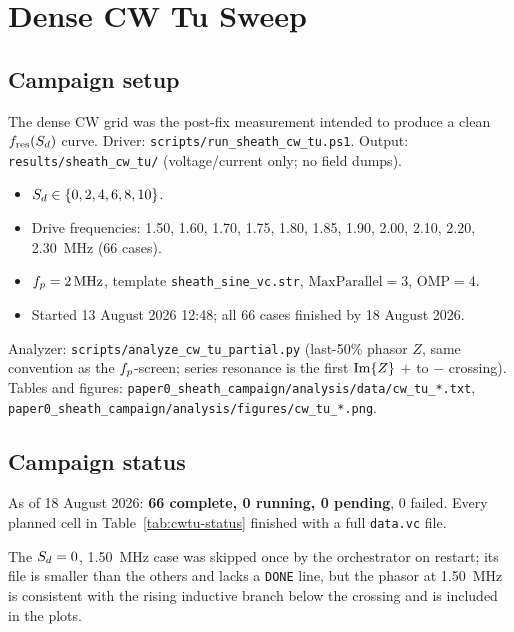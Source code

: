 \chapter{Dense CW Tu Sweep}
\label{ch:cwtu}

\section{Campaign setup}

The dense CW grid was the post-fix measurement intended to produce a clean \(f_{\mathrm{res}}(S_d)\) curve. Driver: \texttt{scripts/run\_sheath\_cw\_tu.ps1}. Output: \texttt{results/sheath\_cw\_tu/} (voltage/current only; no field dumps).

\begin{itemize}[leftmargin=1.5em]
\item \(S_d\in\{0,2,4,6,8,10\}\).
\item Drive frequencies: 1.50, 1.60, 1.70, 1.75, 1.80, 1.85, 1.90, 2.00, 2.10, 2.20, 2.30~MHz (66 cases).
\item \(f_p=\SI{2}{\mega\hertz}\), template \texttt{sheath\_sine\_vc.str}, \(\mathrm{MaxParallel}=3\), \(\mathrm{OMP}=4\).
\item Started 13 August 2026 12:48; all 66 cases finished by 18 August 2026.
\end{itemize}

Analyzer: \texttt{scripts/analyze\_cw\_tu\_partial.py} (last-50\% phasor \(Z\), same convention as the \(f_p\)-screen; series resonance is the first \(\operatorname{Im}\{Z\}\) \(+\) to \(-\) crossing). Tables and figures: \texttt{paper0_sheath_campaign/analysis/data/cw\_tu\_*.txt}, \texttt{paper0_sheath_campaign/analysis/figures/cw\_tu\_*.png}.

\section{Campaign status}

As of 18 August 2026: \textbf{66 complete, 0 running, 0 pending}, 0 failed. Every planned cell in Table~\ref{tab:cwtu-status} finished with a full \texttt{data.vc} file.

The \(S_d=0\), 1.50~MHz case was skipped once by the orchestrator on restart; its file is smaller than the others and lacks a \texttt{DONE} line, but the phasor at 1.50~MHz is consistent with the rising inductive branch below the crossing and is included in the plots.

